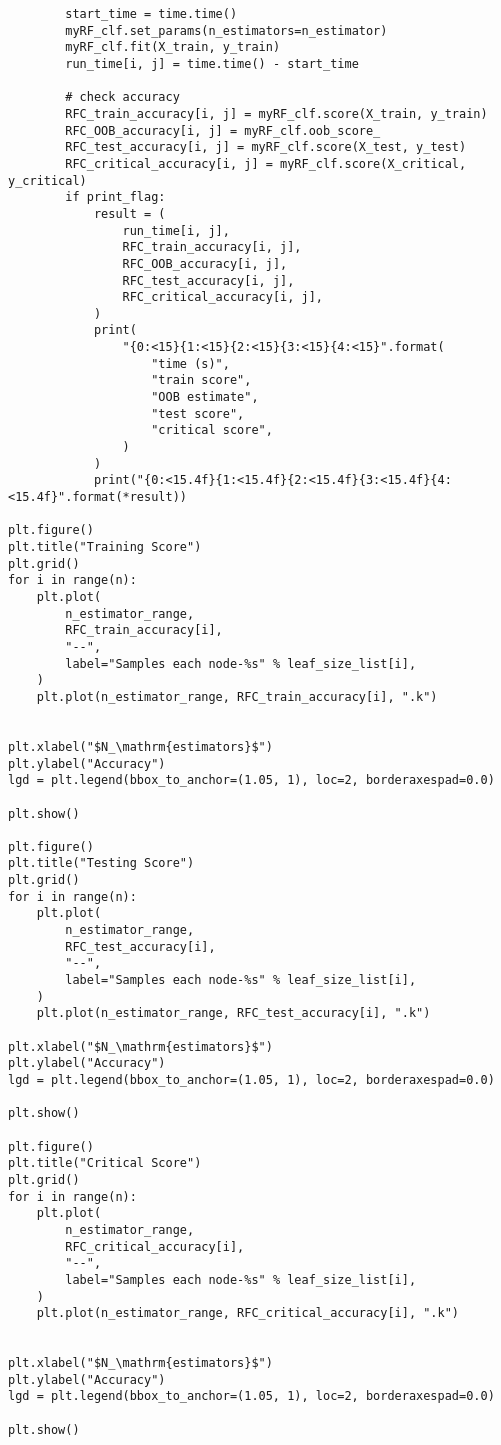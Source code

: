 \begin{verbatim}
        start_time = time.time()
        myRF_clf.set_params(n_estimators=n_estimator)
        myRF_clf.fit(X_train, y_train)
        run_time[i, j] = time.time() - start_time

        # check accuracy
        RFC_train_accuracy[i, j] = myRF_clf.score(X_train, y_train)
        RFC_OOB_accuracy[i, j] = myRF_clf.oob_score_
        RFC_test_accuracy[i, j] = myRF_clf.score(X_test, y_test)
        RFC_critical_accuracy[i, j] = myRF_clf.score(X_critical, y_critical)
        if print_flag:
            result = (
                run_time[i, j],
                RFC_train_accuracy[i, j],
                RFC_OOB_accuracy[i, j],
                RFC_test_accuracy[i, j],
                RFC_critical_accuracy[i, j],
            )
            print(
                "{0:<15}{1:<15}{2:<15}{3:<15}{4:<15}".format(
                    "time (s)",
                    "train score",
                    "OOB estimate",
                    "test score",
                    "critical score",
                )
            )
            print("{0:<15.4f}{1:<15.4f}{2:<15.4f}{3:<15.4f}{4:<15.4f}".format(*result))

plt.figure()
plt.title("Training Score")
plt.grid()
for i in range(n):
    plt.plot(
        n_estimator_range,
        RFC_train_accuracy[i],
        "--",
        label="Samples each node-%s" % leaf_size_list[i],
    )
    plt.plot(n_estimator_range, RFC_train_accuracy[i], ".k")


plt.xlabel("$N_\mathrm{estimators}$")
plt.ylabel("Accuracy")
lgd = plt.legend(bbox_to_anchor=(1.05, 1), loc=2, borderaxespad=0.0)

plt.show()

plt.figure()
plt.title("Testing Score")
plt.grid()
for i in range(n):
    plt.plot(
        n_estimator_range,
        RFC_test_accuracy[i],
        "--",
        label="Samples each node-%s" % leaf_size_list[i],
    )
    plt.plot(n_estimator_range, RFC_test_accuracy[i], ".k")

plt.xlabel("$N_\mathrm{estimators}$")
plt.ylabel("Accuracy")
lgd = plt.legend(bbox_to_anchor=(1.05, 1), loc=2, borderaxespad=0.0)

plt.show()

plt.figure()
plt.title("Critical Score")
plt.grid()
for i in range(n):
    plt.plot(
        n_estimator_range,
        RFC_critical_accuracy[i],
        "--",
        label="Samples each node-%s" % leaf_size_list[i],
    )
    plt.plot(n_estimator_range, RFC_critical_accuracy[i], ".k")


plt.xlabel("$N_\mathrm{estimators}$")
plt.ylabel("Accuracy")
lgd = plt.legend(bbox_to_anchor=(1.05, 1), loc=2, borderaxespad=0.0)

plt.show()

\end{verbatim}

\twocolumn
